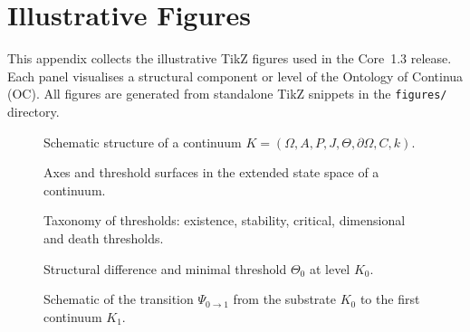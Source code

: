 
\section{Illustrative Figures}
\label{sec:figures}

This appendix collects the illustrative TikZ figures used in the Core~1.3
release. Each panel visualises a structural component or level of the
Ontology of Continua (OC). All figures are generated from standalone
TikZ snippets in the \texttt{figures/} directory.

\begin{figure}[p]
  \centering
  
  \caption{Schematic structure of a continuum
           \(K = (\Omega, A, P, J, \Theta, \partial\Omega, C, k)\).}
  \label{fig:continua-structure}
\end{figure}

\begin{figure}[p]
  \centering
  
  \caption{Axes and threshold surfaces in the extended state space of a
           continuum.}
  \label{fig:axes-thresholds}
\end{figure}

\begin{figure}[p]
  \centering
  
  \caption{Taxonomy of thresholds:
           existence, stability, critical, dimensional and death thresholds.}
  \label{fig:thresholds-taxonomy}
\end{figure}

\begin{figure}[p]
  \centering
  
  \caption{Structural difference and minimal threshold \texorpdfstring{\(\Theta_0\)}{\Theta_0} at level
           \texorpdfstring{\(K_0\)}{K_0}.}
  \label{fig:delta-threshold-k0}
\end{figure}

\begin{figure}[p]
  \centering
  
  \caption{Schematic of the transition \(\Psi_{0\to 1}\) from the substrate
           \(K_0\) to the first continuum \(K_1\).}
  \label{fig:k0-k1-transition}
\end{figure}

